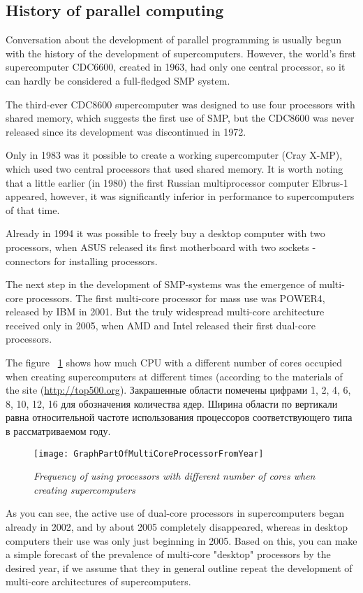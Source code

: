 { %
	\subsection{History of parallel computing}
	\par Conversation about the development of parallel programming is usually begun with the history of the development of supercomputers. However, the world's first supercomputer CDC6600, created in 1963, had only one central processor, so it can hardly be considered a full-fledged SMP system.
	\par The third-ever CDC8600 supercomputer was designed to use four processors with shared memory, which suggests the first use of SMP, but the CDC8600 was never released since its development was discontinued in 1972.
	\par Only in 1983 was it possible to create a working supercomputer (Cray X-MP), which used two central processors that used shared memory. It is worth noting that a little earlier (in 1980) the first Russian multiprocessor computer Elbrus-1 appeared, however, it was significantly inferior in performance to supercomputers of that time.
	\par Already in 1994 it was possible to freely buy a desktop computer with two processors, when ASUS released its first motherboard with two sockets - connectors for installing processors.
	\par The next step in the development of SMP-systems was the emergence of multi-core processors. The first multi-core processor for mass use was POWER4, released by IBM in 2001. But the truly widespread multi-core architecture received only in 2005, when AMD and Intel released their first dual-core processors.
	\par The figure ~\ref{GraphPartOfMultiCoreProcessorFromYear:image} shows how much CPU with a different number of cores occupied when creating supercomputers at different times (according to the materials of the site (\url{http://top500.org}). Закрашенные области помечены цифрами 1, 2, 4, 6, 8, 10, 12, 16 для обозначения количества ядер. Ширина области по вертикали равна относительной частоте использования процессоров соответствующего типа в рассматриваемом году.
	\begin{figure}[H]
		\texttt{[image: GraphPartOfMultiCoreProcessorFromYear]}
		\caption{\textit{Frequency of using processors with different number of cores when creating supercomputers}}
		\label{GraphPartOfMultiCoreProcessorFromYear:image}
	\end{figure}
	\par As you can see, the active use of dual-core processors in supercomputers began already in 2002, and by about 2005 completely disappeared, whereas in desktop computers their use was only just beginning in 2005. Based on this, you can make a simple forecast of the prevalence of multi-core "desktop" processors by the desired year, if we assume that they in general outline repeat the development of multi-core architectures of supercomputers.
	\par
}